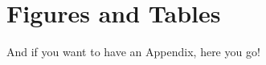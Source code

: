 \appendix
{}
\section{Figures and Tables} \label{sec:figures}

\setlength{\tabcolsep}{10pt}
\renewcommand{\arraystretch}{1.25}

And if you want to have an Appendix, here you go!
